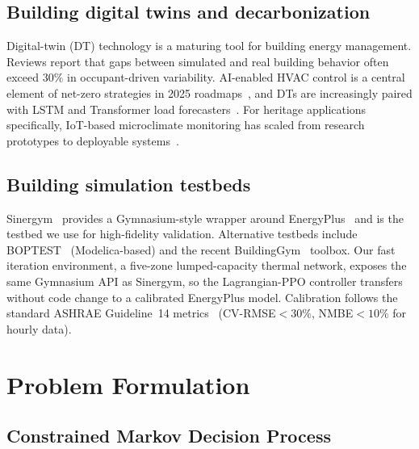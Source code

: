 \documentclass[11pt,a4paper]{article}
\begin{document}
\subsection{Building digital twins and decarbonization}

Digital-twin (DT) technology is a maturing tool for building energy
management. Reviews \citep{dt_buildings_2025,dt_ieq_review_2025} report
that gaps between simulated and real building behavior often exceed
$30\%$ in occupant-driven variability. AI-enabled HVAC control is a
central element of net-zero strategies in 2025
roadmaps~\citep{ai_hvac_zeb_2025}, and DTs are increasingly paired with
LSTM and Transformer load forecasters~\citep{hybrid_lstm_transformer_load_2026,
lstm_transformer_power_2025}. For heritage applications specifically,
IoT-based microclimate monitoring has scaled from research prototypes
to deployable systems~\citep{iot_low_budget_museum_2022,
iot_microclimate_heritage_2024}.

\subsection{Building simulation testbeds}

Sinergym~\citep{manjavacas2024sinergym} provides a Gymnasium-style
wrapper around EnergyPlus~\citep{energyplus} and is the testbed we use
for high-fidelity validation. Alternative testbeds include
BOPTEST~\citep{boptest_mpc_2023} (Modelica-based) and the recent
BuildingGym~\citep{buildinggym_2025} toolbox. Our fast iteration
environment, a five-zone lumped-capacity thermal network, exposes the
same Gymnasium API as Sinergym, so the Lagrangian-PPO controller
transfers without code change to a calibrated EnergyPlus model.
Calibration follows the standard ASHRAE Guideline~14
metrics~\citep{ashrae_guideline14} (CV-RMSE${<}30\%$, NMBE${<}10\%$ for
hourly data).

\section{Problem Formulation}\label{sec:problem}

\subsection{Constrained Markov Decision Process}
\end{document}

